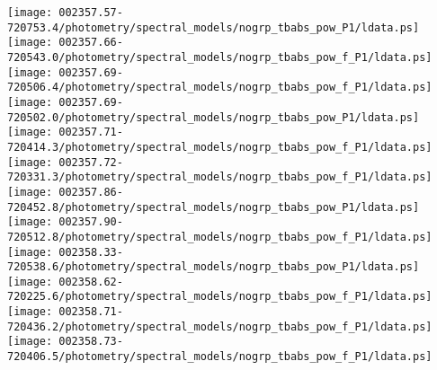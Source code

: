 \documentclass{aastex}
\begin{document}
\begin{figure*}[!ht]
\centering
\texttt{[image: 002357.57-720753.4/photometry/spectral\_models/nogrp\_tbabs\_pow\_P1/ldata.ps]} \hfill 
\texttt{[image: 002357.66-720543.0/photometry/spectral\_models/nogrp\_tbabs\_pow\_f\_P1/ldata.ps]} \hfill 
\texttt{[image: 002357.69-720506.4/photometry/spectral\_models/nogrp\_tbabs\_pow\_f\_P1/ldata.ps]} \\ 
\vspace*{0.5in}
\texttt{[image: 002357.69-720502.0/photometry/spectral\_models/nogrp\_tbabs\_pow\_P1/ldata.ps]} \hfill 
\texttt{[image: 002357.71-720414.3/photometry/spectral\_models/nogrp\_tbabs\_pow\_f\_P1/ldata.ps]} \hfill 
\texttt{[image: 002357.72-720331.3/photometry/spectral\_models/nogrp\_tbabs\_pow\_f\_P1/ldata.ps]} \\ 
\vspace*{0.5in}
\texttt{[image: 002357.86-720452.8/photometry/spectral\_models/nogrp\_tbabs\_pow\_P1/ldata.ps]} \hfill 
\texttt{[image: 002357.90-720512.8/photometry/spectral\_models/nogrp\_tbabs\_pow\_f\_P1/ldata.ps]} \hfill 
\texttt{[image: 002358.33-720538.6/photometry/spectral\_models/nogrp\_tbabs\_pow\_P1/ldata.ps]} \\ 
\vspace*{0.5in}
\texttt{[image: 002358.62-720225.6/photometry/spectral\_models/nogrp\_tbabs\_pow\_f\_P1/ldata.ps]} \hfill 
\texttt{[image: 002358.71-720436.2/photometry/spectral\_models/nogrp\_tbabs\_pow\_f\_P1/ldata.ps]} \hfill 
\texttt{[image: 002358.73-720406.5/photometry/spectral\_models/nogrp\_tbabs\_pow\_f\_P1/ldata.ps]} \\ 
\vspace*{0.5in}
\end{figure*}
\clearpage
\end{document}
